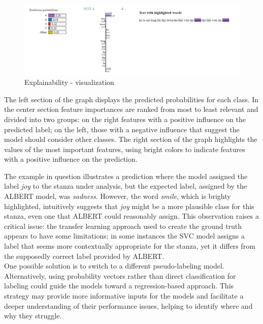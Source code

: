 \begin{figure}[H]
    \centering
    \includegraphics[scale= 0.55]{pictures/expl.png}
    \caption{Explainability - visualization}
    \label{fig:expl}
\end{figure}

The left section of the graph displays the
predicted probabilities for each class. In the center section
feature importances are ranked from most to least relevant and divided into two
groups: on the right
features with a positive influence on the predicted label; on the left, those
with a negative influence that suggest the model should consider other classes.
The right section of the graph highlights the values of the most important
features, using bright colors to indicate features with a positive influence on the
prediction.

The example in question illustrates a prediction where the model assigned the label \textit{joy} to the stanza under analysis, but the expected label, assigned by the ALBERT model, was \textit{sadness}.
However, the word \textit{smile}, which is brighty highlighted, intuitively suggests that \textit{joy} might be a more plausible class for this stanza, even one that ALBERT could reasonably assign. 
This observation raises a critical issue: the transfer learning approach used to create the ground truth appears to have some limitations; in some instances the SVC model assigns a label that seems more contextually appropriate for the stanza, 
yet it differs from the supposedly correct label provided by ALBERT.\\


One possible solution is to switch to a different pseudo-labeling model.
Alternatively, using probability vectors rather than direct classification for
labeling could guide the models toward a regression-based approach. This strategy
may provide more informative inputs for the models and facilitate a deeper
understanding of their performance issues, helping to identify where and why they
struggle.

